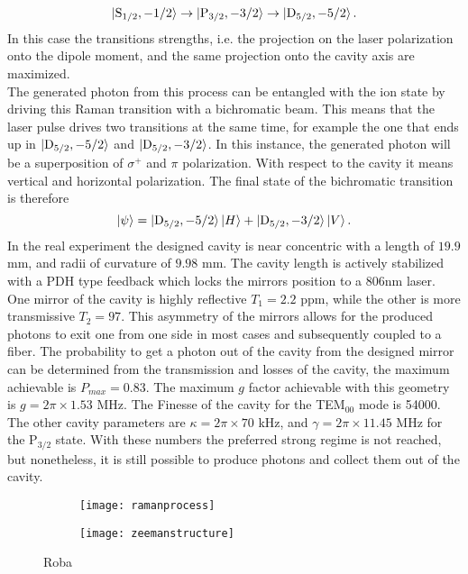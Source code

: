 \begin{equation}
\ket{\text{S}_{1/2},-1/2}\to\ket{\text{P}_{3/2},-3/2} \to \ket{\text{D}_{5/2},-5/2}.
\end{equation}
In this case the transitions strengths, i.e. the projection on the laser polarization onto the dipole moment, and the same projection onto the cavity axis are maximized.\\
The generated photon from this process can be entangled with the ion state by driving this Raman transition with a bichromatic beam. This means that the laser pulse drives two transitions at the same time, for example the one that ends up in $\ket{\text{D}_{5/2},-5/2}$ and $\ket{\text{D}_{5/2},-3/2}$. In this instance, the generated photon will be a superposition of $\sigma^+$ and $\pi$ polarization. With respect to the cavity it means vertical and horizontal polarization. The final state of the bichromatic transition is therefore
\begin{equation}
\ket{\psi} = \ket{\text{D}_{5/2},-5/2}\ket{H} + \ket{\text{D}_{5/2},-3/2}\ket{V}.
\end{equation}
In the real experiment the designed cavity is near concentric with a length of $19.9$ mm, and radii of curvature of $9.98$ mm. The cavity length is actively stabilized with a PDH type feedback which locks the mirrors position to a 806nm laser. One mirror of the cavity is highly reflective $T_1 = 2.2$ ppm, while the other is more transmissive $T_2 = 97$. This asymmetry of the mirrors allows for the produced photons to exit one from one side in most cases and subsequently coupled to a fiber. The probability to get a photon out of the cavity from the designed mirror can be determined from the transmission and losses of the cavity, the maximum achievable is $P_{max} = 0.83$. The maximum $g$ factor achievable with this geometry is $g = 2\pi \times 1.53$ MHz. The Finesse of the cavity for the TEM$_{00}$ mode is 54000. The other cavity parameters are $\kappa = 2\pi \times 70$ kHz, and $\gamma = 2\pi\times 11.45$ MHz for the $\text{P}_{3/2}$ state. With these numbers the preferred strong regime is not reached, but nonetheless,  it is still possible to produce photons and collect them out of the cavity.

\begin{figure}[H]
     \centering
     \begin{subfigure}[b]{0.49\textwidth}
         \centering
         \texttt{[image: ramanprocess]}
     \end{subfigure}
     \hfill
     \begin{subfigure}[b]{0.49\textwidth}
         \centering
         \texttt{[image: zeemanstructure]}
         \vspace{1em}
     \end{subfigure}
        \caption{Roba}
        \label{ramanprocess}
\end{figure}

